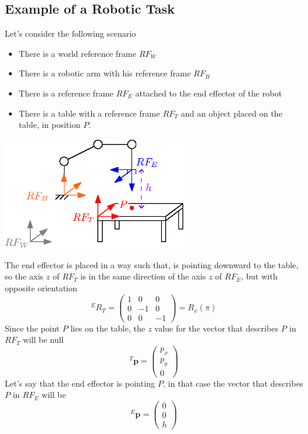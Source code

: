 \documentclass[10pt, letterpaper]{report}
\begin{document}
\subsection{Example of a Robotic Task}
Let's consider the following scenario\begin{itemize}
    \item There is a world reference frame  $RF_W$
    \item There is a robotic arm with his reference frame $RF_B$
    \item There is a reference frame $RF_E$ attached to the end effector of the robot
    \item There is a  table with a reference frame $RF_T$ and an object placed on the table, in position $P$.
\end{itemize}
\begin{center}
    \includegraphics[width=0.6\textwidth ]{images/rob_task.eps}
\end{center}
The end effector is placed in a way such that, is pointing downward to the table, so the axis $z$ of $RF_T$ is in the same direction of the axis $z$ of $RF_E$, but with opposite  orientation\begin{equation}
    {}^ER_T=\begin{pmatrix}
        1&0&0\\ 
        0&-1&0\\ 
        0&0&-1
    \end{pmatrix}=R_x(\pi)
\end{equation}
Since the point $P$ lies on the table, the $z$ value for the vector that describes $P$ in $RF_T$ will be null\begin{equation}
    {}^T\mathbf p=\begin{pmatrix}
        p_x\\p_y\\ 0
    \end{pmatrix}
\end{equation}
Let's say that the end effector is pointing $P$, in that case the vector that describes $P$ in $RF_E$ will be\begin{equation}
    {}^E\mathbf p=\begin{pmatrix}
       0\\0\\ h
    \end{pmatrix}
\end{equation}
\end{document}
